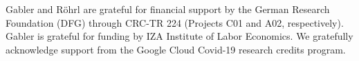 Gabler and Röhrl are grateful for financial support by the German Research Foundation
(DFG) through CRC-TR 224 (Projects C01 and A02, respectively). Gabler is grateful for
funding by IZA Institute of Labor Economics. We gratefully acknowledge support from the
Google Cloud Covid-19 research credits program.
